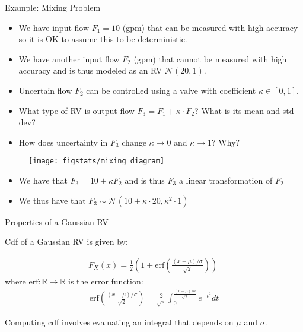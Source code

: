 \documentclass[9pt]{beamer}
\begin{document}
\begin{frame}{Example: Mixing Problem}
\begin{itemize}
\item We have input flow  $F_1=10$ (gpm) that can be measured with high accuracy so it is OK to assume this to be deterministic. 
\item We have another input flow $F_2$ (gpm) that cannot be measured with high accuracy and is thus modeled as an RV $\mathcal{N}(20,1)$. 
\item Uncertain flow $F_2$ can be controlled using a valve with coefficient $\kappa \in [0,1]$. 
\end{itemize}
\begin{block}{}
\begin{itemize}
\item What type of RV is output flow $F_3=F_1+\kappa\cdot F_2$? What is its mean and std dev?
\item How does uncertainty in $F_3$ change $\kappa\to 0$ and $\kappa\to 1$? Why?
\end{itemize}
\end{block}
\begin{figure}[!htb]
    \centering
	\texttt{[image: figstats/mixing\_diagram]}
\end{figure}
\pause
\begin{itemize}
\item We have that $F_3=10+\kappa F_2$ and is thus $F_3$ a linear transformation of $F_2$
\item We thus have that $F_3\sim\mathcal{N}(10+\kappa\cdot 20,\kappa^2\cdot 1)$
\end{itemize}
\end{frame}


%
\begin{frame}{Properties of a Gaussian RV}

Cdf of a Gaussian RV is given by:
\begin{block}{}
\begin{align*}
F_X(x)=\frac{1}{2}\left(1+\textrm{erf}\left(\frac{(x-\mu)/\sigma}{\sqrt{2}}\right)\right)\; 
\end{align*}
where $\textrm{erf}:\mathbb{R}\to \mathbb{R}$ is the error function:
\begin{align*}
\textrm{erf}\left(\frac{(x-\mu)/\sigma}{\sqrt{2}}\right)=\frac{2}{\sqrt{\pi}}\int_0^{\frac{(x-\mu)/\sigma}{\sqrt{2}}}e^{-t^2}dt
\end{align*}
\end{block}
Computing cdf involves evaluating an integral that depends on $\mu$ and $\sigma$. 

\end{frame}
\end{document}
